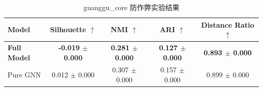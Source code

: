 \begin{table}[htbp]
  \centering
  \caption{guanggu_core 防作弊实验结果}
  \label{tab:guanggu_core_anti_cheat_results}
  \begin{tabular}{lcccc}
    \toprule
    Model & Silhouette $\uparrow$ & NMI $\uparrow$ & ARI $\uparrow$ & Distance Ratio $\uparrow$ \\
    \midrule
    \textbf{Full Model} & \textbf{-0.019 $\pm$ 0.000} & \textbf{0.281 $\pm$ 0.000} & \textbf{0.127 $\pm$ 0.000} & \textbf{0.893 $\pm$ 0.000} \\
    Pure GNN & 0.012 $\pm$ 0.000 & 0.307 $\pm$ 0.000 & 0.157 $\pm$ 0.000 & 0.899 $\pm$ 0.000 \\
    \bottomrule
  \end{tabular}
\end{table}